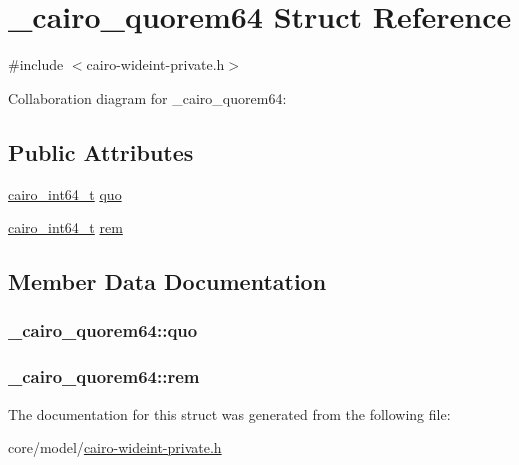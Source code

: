 \hypertarget{struct__cairo__quorem64}{}\section{\+\_\+cairo\+\_\+quorem64 Struct Reference}
\label{struct__cairo__quorem64}


{\ttfamily \#include $<$cairo-\/wideint-\/private.\+h$>$}



Collaboration diagram for \+\_\+cairo\+\_\+quorem64\+:
\subsection*{Public Attributes}
\begin{DoxyCompactItemize}
\item 
\hyperlink{cairo-wideint-private_8h_a31b93307f43703e28eef43fad0166834}{cairo\+\_\+int64\+\_\+t} \hyperlink{struct__cairo__quorem64_a5a2c9e446fc6289c7d49969ad391aa9e}{quo}
\item 
\hyperlink{cairo-wideint-private_8h_a31b93307f43703e28eef43fad0166834}{cairo\+\_\+int64\+\_\+t} \hyperlink{struct__cairo__quorem64_a840d781bdb9aed72d0ac98c7f1f22d6a}{rem}
\end{DoxyCompactItemize}


\subsection{Member Data Documentation}
\subsubsection[{\texorpdfstring{quo}{quo}}]{ \+\_\+cairo\+\_\+quorem64\+::quo}\hypertarget{struct__cairo__quorem64_a5a2c9e446fc6289c7d49969ad391aa9e}{}\label{struct__cairo__quorem64_a5a2c9e446fc6289c7d49969ad391aa9e}
\subsubsection[{\texorpdfstring{rem}{rem}}]{ \+\_\+cairo\+\_\+quorem64\+::rem}\hypertarget{struct__cairo__quorem64_a840d781bdb9aed72d0ac98c7f1f22d6a}{}\label{struct__cairo__quorem64_a840d781bdb9aed72d0ac98c7f1f22d6a}


The documentation for this struct was generated from the following file\+:\begin{DoxyCompactItemize}
\item 
core/model/\hyperlink{cairo-wideint-private_8h}{cairo-\/wideint-\/private.\+h}\end{DoxyCompactItemize}
